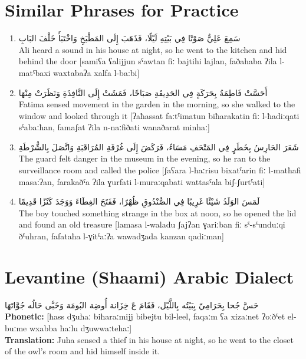 \documentclass[letterpaper,12pt]{article}
\begin{document}
\section{Similar Phrases for Practice}

\begin{enumerate}
\item \textarabic{سَمِعَ عَلِيٌّ صَوْتًا فِي بَيْتِهِ لَيْلًا، فَذَهَبَ إِلَى المَطْبَخِ وَاخْتَبَأَ خَلْفَ البَابِ}\\
Ali heard a sound in his house at night, so he went to the kitchen and hid behind the door [samiʕa ʕalijjun sˤawtan fiː bajtihi lajlan, faðahaba ʔila l-matˤbaxi waxtabaʔa xalfa l-baːbi]

\item \textarabic{أَحَسَّتْ فَاطِمَةُ بِحَرَكَةٍ فِي الحَدِيقَةِ صَبَاحًا، فَمَشَتْ إِلَى النَّافِذَةِ وَنَظَرَتْ مِنْهَا}\\
Fatima sensed movement in the garden in the morning, so she walked to the window and looked through it [ʔaħassat faːtˤimatun biħarakatin fiː l-ħadiːqati sˤabaːħan, famaʃat ʔila n-naːfiðati wanaðarat minhaː]

\item \textarabic{شَعَرَ الحَارِسُ بِخَطَرٍ فِي المَتْحَفِ مَسَاءً، فَرَكَضَ إِلَى غُرْفَةِ المُرَاقَبَةِ وَاتَّصَلَ بِالشُّرْطَةِ}\\
The guard felt danger in the museum in the evening, so he ran to the surveillance room and called the police [ʃaʕara l-ħaːrisu bixatˤarin fiː l-matħafi masaːʔan, farakaðˤa ʔila ɣurfati l-muraːqabati wattasˤala biʃ-ʃurtˤati]

\item \textarabic{لَمَسَ الوَلَدُ شَيْئًا غَرِيبًا فِي الصُّنْدُوقِ ظُهْرًا، فَفَتَحَ الغِطَاءَ وَوَجَدَ كَنْزًا قَدِيمًا}\\
The boy touched something strange in the box at noon, so he opened the lid and found an old treasure [lamasa l-waladu ʃajʔan ɣariːban fiː sˤ-sˤunduːqi ðˤuhran, fafataħa l-ɣitˤaːʔa wawadʒada kanzan qadiːman]
\end{enumerate}

\section{Levantine (Shaami) Arabic Dialect}

\begin{tcolorbox}[colback=white,colframe=dialectcolor,title=\textbf{Levantine Version},breakable]
\textarabic{حَسَّ جُحا بِحَرَامِيّ بِبَيْتُه بِاللَّيْل، فَقَامَ عَ خِزَانة أُوضِة البُومَة وَخَبَّى حَالُه جُوَّاتَهَا}\\
\textbf{Phonetic:} [ħass dʒuħaː biħaraːmijj bibejtu bil-leel, faqaːm ʕa xizaːnet ʔoːðˤet el-buːme wxabba ħaːlu dʒuwwaːtehaː]\\
\textbf{Translation:} Juha sensed a thief in his house at night, so he went to the closet of the owl's room and hid himself inside it.
\end{tcolorbox}
\end{document}
